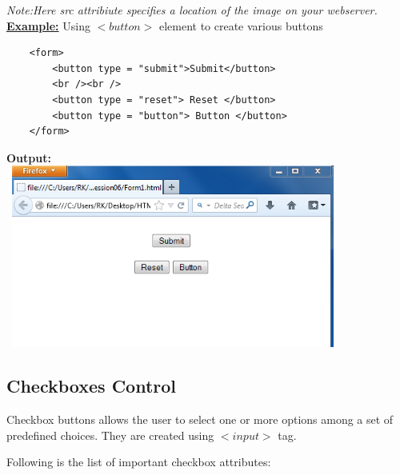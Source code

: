 \documentclass[11pt,a4paper]{article}
\begin{document}
\emph{Note:Here src attribiute specifies a location of the image on your webserver.}\\

\underline{\textbf{Example:}} Using $<button>$ element to create various buttons\\
\begin{verbatim}
    <form>
        <button type = "submit">Submit</button>
        <br /><br />
        <button type = "reset"> Reset </button>
        <button type = "button"> Button </button>
    </form>
\end{verbatim}

\textbf{Output:}\\

\includegraphics[height = 60mm, width = 110mm]{Form6.png}\\

\subsection*{Checkboxes Control}
Checkbox buttons allows the user to select one or more options among a set of predefined choices. They are created using $<input>$ tag.

Following is the list of important checkbox attributes:
\end{document}

